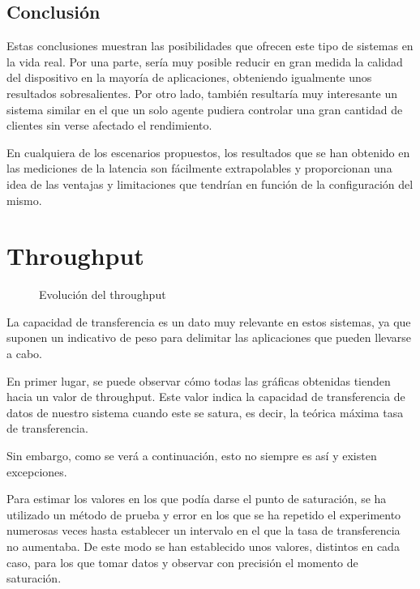 \documentclass[a4paper,11pt,spanish]{sphinxmanual}
\let\sphinxpxdimen\pdfpxdimen\else\newdimen\sphinxpxdimen
\begin{document}
\subsection{Conclusión}
\label{\detokenize{resultados:conclusion}}
\sphinxAtStartPar
Estas conclusiones muestran las posibilidades que ofrecen este tipo de sistemas en la vida
real. Por una parte, sería muy posible reducir en gran medida la calidad del dispositivo en
la mayoría de aplicaciones, obteniendo igualmente unos resultados sobresalientes. Por
otro lado, también resultaría muy interesante un sistema similar en el que un solo agente
pudiera controlar una gran cantidad de clientes sin verse afectado el rendimiento.

\sphinxAtStartPar
En cualquiera de los escenarios propuestos, los resultados que se han obtenido
en las mediciones de la latencia son fácilmente extrapolables y proporcionan una idea
de las ventajas y limitaciones que tendrían en función de la configuración del
mismo.


\section{Throughput}
\label{\detokenize{resultados:throughput}}
\begin{figure}[htbp]
\centering
\capstart

\noindent\sphinxincludegraphics[width=650\sphinxpxdimen]{{throughput}.png}
\caption{Evolución del throughput}\label{\detokenize{resultados:id4}}\end{figure}

\sphinxAtStartPar
La capacidad de transferencia es un dato muy relevante en estos sistemas,
ya que suponen un indicativo de peso para delimitar las aplicaciones que pueden
llevarse a cabo.

\sphinxAtStartPar
En primer lugar, se puede observar cómo todas las gráficas obtenidas tienden hacia
un valor de throughput. Este valor indica la capacidad de transferencia de datos
de nuestro sistema cuando este se satura, es decir, la teórica máxima tasa de
transferencia.

\sphinxAtStartPar
Sin embargo, como se verá a continuación, esto no siempre es así y existen
excepciones.

\sphinxAtStartPar
Para estimar los valores en los que podía darse el punto de saturación,
se ha utilizado un método de prueba y error en los que se ha repetido el experimento
numerosas veces hasta establecer un intervalo en el que la tasa de transferencia no
aumentaba. De este modo se han establecido unos valores, distintos en cada caso,
para los que tomar datos y observar con precisión el momento de saturación.
\end{document}
